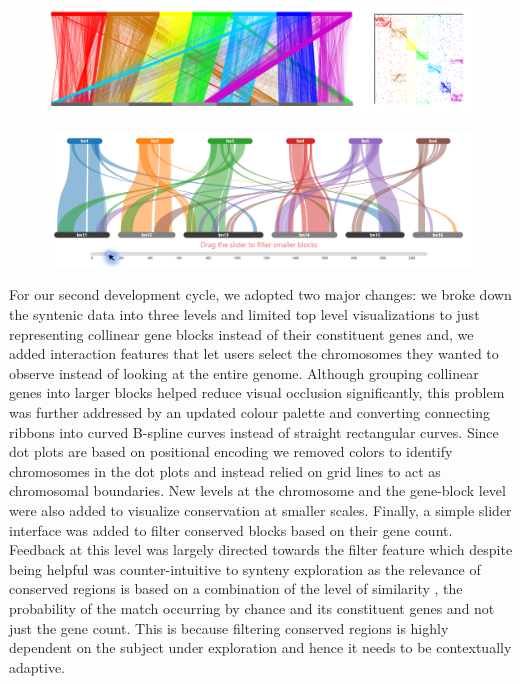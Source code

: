 \begin{figure}
  \centering
  \includegraphics[width=1\linewidth]{images/ch_4_first_iteration.PNG}
  \label{fig:ch_4_first_iteration}
\end{figure}

\begin{figure}[h]
  \centering
  \includegraphics[width=0.85\linewidth]{images/ch_4_base_viewer.PNG}
  \label{fig:ch_4_base_viewer}
\end{figure}


For our second development cycle, we adopted two major changes: we broke down the syntenic data into three levels and limited top level visualizations to just representing collinear gene blocks instead of their constituent genes and, we added interaction features that let users select the chromosomes they wanted to observe instead of looking at the entire genome. Although grouping collinear genes into larger blocks helped reduce visual occlusion significantly, this problem was further addressed by an updated colour palette and converting connecting ribbons into curved B-spline curves instead of straight rectangular curves. Since dot plots are based on positional encoding we removed colors to identify chromosomes in the dot plots and instead relied on grid lines to act as chromosomal boundaries. New levels at the chromosome and the gene-block level were also added to visualize conservation at smaller scales. Finally, a simple slider interface was added to filter conserved blocks based on their gene count. Feedback at this level was largely directed towards the filter feature which despite being helpful was counter-intuitive to synteny exploration as the relevance of conserved regions is based on a combination of the level of similarity , the probability of the match occurring by chance and its constituent genes and not just the gene count. This is because filtering conserved regions is highly dependent on the subject under exploration and hence it needs to be contextually adaptive.


